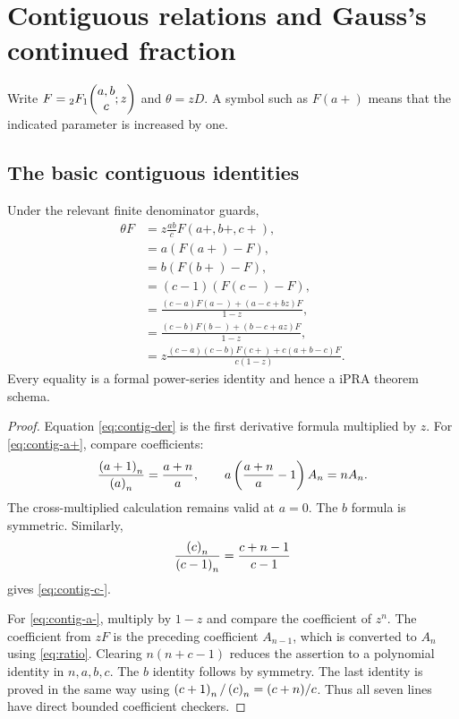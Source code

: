 \section{Contiguous relations and Gauss's continued fraction}\label{sec:contiguous}

Write \(F={}_2F_1\!\left(\begin{matrix}a,b\\c\end{matrix};z\right)\) and \(\theta=zD\).  A symbol such as \(F(a+)\)
means that the indicated parameter is increased by one.

\subsection{The basic contiguous identities}

\begin{theorem}\label{thm:contiguous-master}
Under the relevant finite denominator guards,
\begin{align}
 \theta F
 &=z\frac{ab}{c}F(a+,b+,c+),\label{eq:contig-der}\\
 &=a(F(a+)-F),\label{eq:contig-a+}\\
 &=b(F(b+)-F),\label{eq:contig-b+}\\
 &=(c-1)(F(c-)-F),\label{eq:contig-c-}\\
 &=\frac{(c-a)F(a-)+(a-c+bz)F}{1-z},\label{eq:contig-a-}\\
 &=\frac{(c-b)F(b-)+(b-c+az)F}{1-z},\label{eq:contig-b-}\\
 &=z\frac{(c-a)(c-b)F(c+)+c(a+b-c)F}{c(1-z)}.
 \label{eq:contig-c+}
\end{align}
Every equality is a formal power-series identity and hence a \StatusA{}
iPRA theorem schema.
\end{theorem}

\begin{proof}
Equation \eqref{eq:contig-der} is the first derivative formula multiplied by
\(z\).  For \eqref{eq:contig-a+}, compare coefficients:
\[
 \frac{\left(a+1\right)_{n}}{\left(a\right)_{n}}=\frac{a+n}{a},
 \qquad
 a\left(\frac{a+n}{a}-1\right)A_n=nA_n.
\]
The cross-multiplied calculation remains valid at \(a=0\).  The \(b\) formula
is symmetric.  Similarly,
\[
 \frac{\left(c\right)_{n}}{\left(c-1\right)_{n}}=\frac{c+n-1}{c-1}
\]
gives \eqref{eq:contig-c-}.

For \eqref{eq:contig-a-}, multiply by \(1-z\) and compare the coefficient of
\(z^n\).  The coefficient from \(zF\) is the preceding coefficient
\(A_{n-1}\), which is converted to \(A_n\) using
\eqref{eq:ratio}.  Clearing
\(n(n+c-1)\) reduces the assertion to a polynomial identity in
\(n,a,b,c\).  The \(b\) identity follows by symmetry.  The last identity is
proved in the same way using
\(\left(c+1\right)_{n}/\left(c\right)_{n}=(c+n)/c\).  Thus all seven lines have direct bounded
coefficient checkers.
\end{proof}

